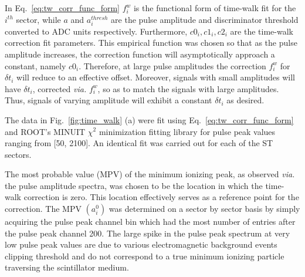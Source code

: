 In Eq.~\ref{eq:tw_corr_func_form} $f^{w}_{i}$ is the functional form of time-walk fit for the $i^{th}$ sector, while $a$ and $a^{thresh}_{i}$ are the pulse amplitude and discriminator threshold converted to ADC units respectively.  Furthermore, $c0_{i}, c1_{i}, c2_{i}$ are the time-walk correction fit parameters.  This empirical function was chosen so that as the pulse amplitude increases, the correction function will asymptotically approach a constant, namely $c0_{i}$.  Therefore, at large pulse amplitudes the correction $f^{w}_{i}$ for $\delta t_{i}$ will reduce to an effective offset.  Moreover, signals with small amplitudes will have $\delta t_{i}$, corrected \textit{via.} $f^{w}_{i}$, so as to match the signals with large amplitudes.  Thus, signals of varying amplitude will exhibit a constant $\delta t_{i}$ as desired.

The data in Fig.~\ref{fig:time_walk} (a) were fit using Eq.~\ref{eq:tw_corr_func_form} and ROOT's MINUIT $\chi^{2}$ minimization fitting library \cite{root_minuit} for pulse peak values ranging from [50, 2100].  An identical fit was carried out for each of the ST sectors.


The most probable value (MPV) of the minimum ionizing peak, as observed \textit{via.} the pulse amplitude spectra, was chosen to be the location in which the time-walk correction is zero.  This location effectively serves as a reference point for the correction.  
The MPV $(a^{0}_{i})$ was determined on a sector by sector basis by simply acquiring the pulse peak channel bin which had the most number of entries after the pulse peak channel 200.  The large spike in the pulse peak spectrum at very low pulse peak values are due to various electromagnetic background events clipping threshold and do not correspond to a true minimum ionizing particle traversing the scintillator medium.

